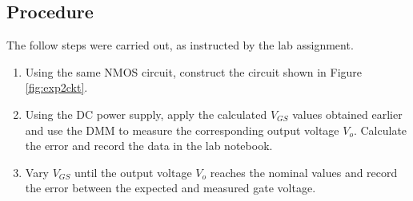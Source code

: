 \documentclass{report}
\begin{document}
\subsection{Procedure}
The follow steps were carried out, as instructed by the lab assignment.
\begin{enumerate}
	\item Using the same NMOS circuit, construct the circuit shown in Figure \ref{fig:exp2ckt}.
	\item Using the DC power supply, apply the calculated $V_{GS}$ values obtained earlier and use the DMM to measure the corresponding output voltage $V_o$. Calculate the error and record the data in the lab notebook.
	\item Vary $V_{GS}$ until the output voltage $V_o$ reaches the nominal values and record the error between the expected and measured gate voltage.
\end{enumerate}
\end{document}
